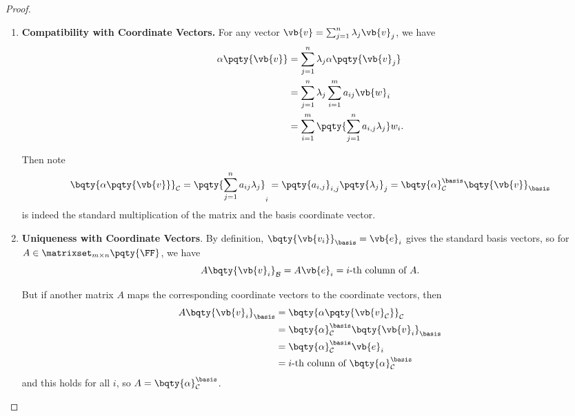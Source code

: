 \begin{proof}
    \begin{enumerate}[label=(\roman*)]
        \item \textbf{Compatibility with Coordinate Vectors.} For any vector \(\vb{v} = \sum_{j = 1}^{n} \lambda_j \vb{v}_j\), we have
        \begin{align*}
            \alpha\pqty{\vb{v}} &= \sum_{j = 1}^{n} \lambda_j \alpha\pqty{\vb{v}_j} \\
            &= \sum_{j = 1}^{n} \lambda_j \sum_{i = 1}^{m} a_{ij} \vb{w}_i \\
            &= \sum_{i = 1}^{m} \pqty{\sum_{j = 1}^{n} a_{i, j} \lambda_j} w_i.
        \end{align*}
    
        Then note
        \[  
            \bqty{\alpha\pqty{\vb{v}}}_{\mathcal{C}} = \pqty{\sum_{j = 1}^{n} a_{ij} \lambda_j}_i = \pqty{a_{i, j}}_{i, j} \pqty{\lambda_j}_j = \bqty{\alpha}_{\mathcal{C}}^{\basis} \bqty{\vb{v}}_{\basis}
        \]
        is indeed the standard multiplication of the matrix and the basis coordinate vector.
    
        \item \textbf{Uniqueness with Coordinate Vectors}. By definition, \(\bqty{\vb{v_i}}_{\basis} = \vb{e}_i\) gives the standard basis vectors, so for \(A \in \matrixset_{m \times n} \pqty{\FF}\), we have
        \[
            A \bqty{\vb{v}_i}_{\mathcal{B}} = A \vb{e}_i = i\text{-th column of }A.
        \]
    
        But if another matrix \(A\) maps the corresponding coordinate vectors to the coordinate vectors, then
        \begin{align*}
            A \bqty{\vb{v}_i}_{\basis} &= \bqty{\alpha \pqty{\vb{v}_\mathcal{C}}}_{\mathcal{C}} \\
            &= \bqty{\alpha}_{\mathcal{C}}^{\basis} \bqty{\vb{v}_i}_{\basis} \\
            &= \bqty{\alpha}_{\mathcal{C}}^{\basis} \vb{e}_i \\
            &= i\text{-th colunn of } \bqty{\alpha}_{\mathcal{C}}^{\basis}
        \end{align*}
        and this holds for all \(i\), so \(A = \bqty{\alpha}_{\mathcal{C}}^{\basis}\).
    

\end{enumerate}
\end{proof}
